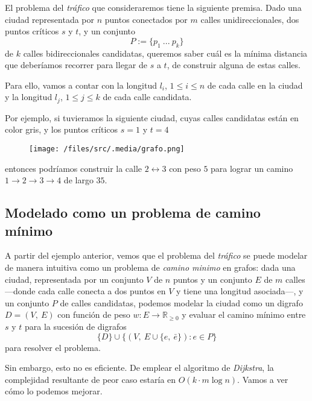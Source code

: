 El problema del \textit{tráfico} que consideraremos tiene la siguiente premisa. Dado una ciudad representada por $n$ puntos conectados por $m$ calles unidireccionales, dos puntos críticos $s$ y $t$, y un conjunto
\begin{equation*}
    P := \{p_1 \ ... \ p_k\}    
\end{equation*}
de $k$ calles bidireccionales candidatas, queremos saber cuál es la mínima distancia que deberíamos recorrer para llegar de $s$ a $t$, de construir alguna de estas calles.

Para ello, vamos a contar con la longitud $l_i$, $1 \leq i \leq n$ de cada calle en la ciudad y la longitud $l_j$, $1 \leq j \leq k$ de cada calle candidata.

Por ejemplo, si tuvieramos la siguiente ciudad, cuyas calles candidatas están en color gris, y los puntos críticos $s = 1$ y $t = 4$

\begin{figure}[!htbp]
    \texttt{[image: /files/src/.media/grafo.png]} 
\end{figure}
    
\noindent entonces podríamos construir la calle $2 \leftrightarrow 3$ con peso $5$ para lograr un camino $1 \to 2 \to 3 \to 4$ de largo $35$.

\subsection{Modelado como un problema de camino mínimo}\label{modelo} 

A partir del ejemplo anterior, vemos que el problema del \textit{tráfico} se puede modelar de manera intuitiva como un problema de \textit{camino minimo} en grafos: dada una ciudad, representada por un conjunto $V$ de $n$ puntos y un conjunto $E$ de $m$ calles ---donde cada calle conecta a dos puntos en $V$ y tiene una longitud asociada---, y un conjunto $P$ de calles candidatas, podemos modelar la ciudad como un digrafo $D = (V,\ E)$ con función de peso $w: E \to \mathbb{R}_{\geq 0}$ y evaluar el camino mínimo entre $s$ y $t$ para la sucesión de digrafos
\begin{equation}\label{eq_1}
    \{D\} \cup \{(V,\ E \cup \{e,\ \bar{e}\}) : e \in P\}
\end{equation}
para resolver el problema.

Sin embargo, esto no es eficiente. De emplear el algoritmo de \textit{Dijkstra}, la complejidad resultante de peor caso estaría en $O(k\cdot m\log n)$. Vamos a ver cómo lo podemos mejorar. 

